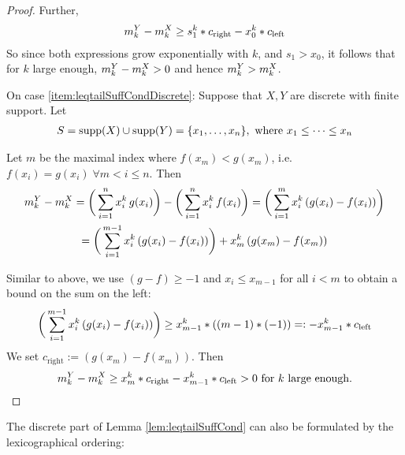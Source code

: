\documentclass[a4paper]{scrreprt}
\DeclareMathOperator{\supp}{supp}
\begin{document}
\begin{proof}
        Further,
        \begin{gather*}
            m_k^Y - m_k^X
            \geq s_1^k * c_{\text{right}} - x_0^k * c_{\text{left}}
        \end{gather*}
        So since both expressions grow exponentially with $k$, and $s_1 > x_0$, it follows that for $k$ large enough, $m_k^Y - m_k^X > 0$ and hence $m_k^Y > m_k^X$.
        
        
        On case \ref{item:leqtailSuffCondDiscrete}: Suppose that $X, Y$ are discrete with finite support. Let 
        \begin{gather*}
            S = \supp(X) \cup \supp(Y) = \set{x_1, \dots, x_n}, \text{ where } x_1 \leq \dots \leq x_n
        \end{gather*}
        
        Let $m$ be the maximal index where $f(x_m) < g(x_m)$, i.e. $f(x_i) = g(x_i) \;\forall m < i \leq n$.
        Then
        \begin{multline*}
            m_k^Y - m_k^X
            = \bigg(\sum_{i=1}^{n} x_i^k \,g(x_i)\bigg) - \bigg(\sum_{i=1}^{n} x_i^k \,f(x_i)\bigg)
            = \bigg(\sum_{i=1}^{m} x_i^k \,(g(x_i) - f(x_i))\bigg) \\
            = \bigg(\sum_{i=1}^{m-1} x_i^k \,(g(x_i) - f(x_i))\bigg) + x_m^k \,(g(x_m) - f(x_m))
        \end{multline*}
        
        Similar to above, we use $(g -f) \geq -1$ and $x_i \leq x_{m-1}$ for all $i < m$ to obtain a bound on the sum on the left:
        \begin{gather*}
            \bigg(\sum_{i=1}^{m-1} x_i^k \,(g(x_i) - f(x_i))\bigg)
            \geq x_{m-1}^k * ((m-1) * (-1))
            =: -x_{m-1}^k * c_{\text{left}}
        \end{gather*}
        We set $c_{\text{right}} := (g(x_m) - f(x_m))$. Then
        \begin{gather*}
            m_k^Y - m_k^X \geq x_m^k * c_{\text{right}} -x_{m-1}^k * c_{\text{left}} > 0 \text{ for $k$ large enough.}
        \end{gather*}        
    \end{proof}

    The discrete part of Lemma \ref{lem:leqtailSuffCond} can also be formulated by the lexicographical ordering:
    
\end{document}
